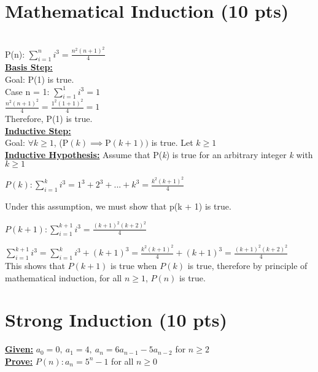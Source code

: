 \documentclass[a4paper]{article}
\begin{document}
\bigskip %

\section{Mathematical Induction (10 pts)}
 \unboldmath \\
P(n): $\sum_{i=1}^n i^3 = \frac{n^2(n+1)^2}{4}$\\

\textbf{\ul{Basis Step:}}\\
Goal: P(1) is true.\\
Case n = 1: $\sum_{i=1}^1 i^3 = 1$\\
$\frac{n^2(n+1)^2}{4} = \frac{1^2(1+1)^2}{4} = 1$\\
Therefore, P(1) is true.\\

\textbf{\ul{Inductive Step:}}\\
Goal: $\forall k \ge 1$, (P$(k) \implies $P$(k+1))$ is true. Let $k \ge 1$ \\

\ul{\textbf{Inductive Hypothesis:}} 
Assume that P(\textit{k}) is true for an arbitrary integer \textit{k} with $k \ge 1$
\begin{center} 
$P(k): \sum_{i=1}^k i^3 = 1^3 + 2^3 + ... + k^3 = \frac{k^2(k+1)^2}{4}$
\end{center}
    Under this assumption, we must show that p(k + 1) is true.
\begin{center}
    $P(k + 1): \sum_{i=1}^{k+1} i^3 = \frac{(k + 1)^2(k + 2)^2}{4}$
\end{center}
$\sum_{i=1}^{k+1} i^3 = \sum_{i=1}^{k} i^3 + (k + 1)^3 = 
\frac{k^2(k + 1)^2}{4} + (k + 1)^3 = \frac{(k + 1)^2(k + 2)^2}{4}$\\
This shows that $P(k + 1)$ is true when $P(k)$ is true, therefore by principle of mathematical induction, for all $n \ge 1$, $P(n)$ is true.\\


\bigskip %

\section{Strong Induction (10 pts)}
\ul{\textbf{Given:}} $a_0 = 0,\: a_1 = 4,\: a_n = 6a_{n - 1} - 5a_{n - 2}$ for $n \ge 2$\\
\ul{\textbf{Prove:}} $P(n): a_n = 5^n - 1$ for all $n \ge 0$\\
\end{document}
